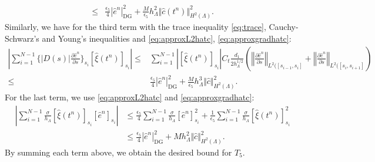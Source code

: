 \documentclass[pdflatex,sn-mathphys-num]{sn-jnl}%
\newcommand{\bfn}{{\boldsymbol n}}
\newcommand{\bfU}{{\boldsymbol U}}
\newcommand{\DG}{\mathrm{DG}}
\theoremstyle{thmstyleone}%
\theoremstyle{thmstyletwo}%
\theoremstyle{thmstylethree}%
\begin{document}
\begin{appendices}
\begin{align*}
\leq  & \frac{\epsilon_5}{4} |\hat e^n|^2_\DG + \frac{M}{\epsilon_5}  h^2_\Lambda \Vert \hat c(t^n) \Vert^2_{H^2(\Lambda)}.
\end{align*}
Similarly, we have for the third term with the trace inequality \eqref{eq:trace}, Cauchy-Schwarz's and Young's inequalities and \eqref{eq:approxL2hatc}, \eqref{eq:approxgradhatc}:
\begin{align*}
    \left\vert  \sum_{i=1}^{N-1}\{ |D(s)|\frac{\partial \hat e^n}{\partial s}\}_{s_i} [\hat \xi(t^{n})]_{s_i} \right\vert \leq  &
    \sum_{i=1}^{N-1} |[\hat \xi(t^n)]_{s_i}| C_t \frac{d_1}{2 h_\Lambda^{1/2}} \left( \left\Vert \frac{\partial \hat e^n}{\partial s}\right\Vert_{L^2([s_{i-1},s_i]}
    +\left\Vert \frac{\partial \hat e^n}{\partial s}\right\Vert_{L^2([s_{i},s_{i+1}]}\right) 
    \\
    \leq & 
    \frac{\epsilon_5}{4} |\hat e^n|^2_\DG + \frac{M}{ \epsilon_5} h^3_\Lambda \Vert \hat c\Vert ^2_{H^2(\Lambda)}.
\end{align*}
For the last term, we use \eqref{eq:approxL2hatc} and \eqref{eq:approxgradhatc}:
\begin{align*}
    \left\vert\sum_{i=1}^{N-1} \frac{\sigma}{h_\Lambda}[\hat \xi(t^{n})]_{s_i} [\hat e^n]_{s_i} \right\vert
    &\leq \frac{\epsilon_5}{4}\sum_{i=1}^{N-1}\frac{\sigma}{h_\Lambda}[\hat e^n]_{s_i}^2
    + \frac{1}{\epsilon_5}\sum_{i=1}^{N-1}\frac{\sigma}{h_\Lambda}[\hat \xi(t^{n})]_{s_i}^2 
    \\
    &\leq \frac{\epsilon_5}{4} |\hat e^n|^2_\DG + M h^2_\Lambda \Vert\hat c\Vert^2_{H^2(\Lambda)}.
\end{align*}
By summing each term above, we obtain the desired bound for $T_5$.




\end{appendices}
\end{document}

